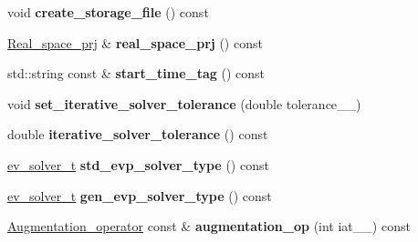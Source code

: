 \begin{DoxyCompactItemize}
\item 
\hypertarget{classsirius_1_1_simulation__context_a61ecdd5eae60b0b213d6c9ca95218bce}{}void {\bfseries create\+\_\+storage\+\_\+file} () const \label{classsirius_1_1_simulation__context_a61ecdd5eae60b0b213d6c9ca95218bce}

\item 
\hypertarget{classsirius_1_1_simulation__context_aeec6fe93912cbecd5c318cd3d00aa6b8}{}\hyperlink{classsirius_1_1_real__space__prj}{Real\+\_\+space\+\_\+prj} \& {\bfseries real\+\_\+space\+\_\+prj} () const \label{classsirius_1_1_simulation__context_aeec6fe93912cbecd5c318cd3d00aa6b8}

\item 
\hypertarget{classsirius_1_1_simulation__context_a76eefe6f28881152e2406340c73662a9}{}std\+::string const \& {\bfseries start\+\_\+time\+\_\+tag} () const \label{classsirius_1_1_simulation__context_a76eefe6f28881152e2406340c73662a9}

\item 
\hypertarget{classsirius_1_1_simulation__context_a28d1a35e1fea2921d498fb2a7510501b}{}void {\bfseries set\+\_\+iterative\+\_\+solver\+\_\+tolerance} (double tolerance\+\_\+\+\_\+)\label{classsirius_1_1_simulation__context_a28d1a35e1fea2921d498fb2a7510501b}

\item 
\hypertarget{classsirius_1_1_simulation__context_a978ba28b12e2e62c34e9adef0bb0bac3}{}double {\bfseries iterative\+\_\+solver\+\_\+tolerance} () const \label{classsirius_1_1_simulation__context_a978ba28b12e2e62c34e9adef0bb0bac3}

\item 
\hypertarget{classsirius_1_1_simulation__context_a136956341cfc80f77e3ec4a2b67757cd}{}\hyperlink{eigenproblem_8h_a203f2c57422a6e64834e6e9ab85982bf}{ev\+\_\+solver\+\_\+t} {\bfseries std\+\_\+evp\+\_\+solver\+\_\+type} () const \label{classsirius_1_1_simulation__context_a136956341cfc80f77e3ec4a2b67757cd}

\item 
\hypertarget{classsirius_1_1_simulation__context_a2403806b7725eaf863a2578628a9a2ac}{}\hyperlink{eigenproblem_8h_a203f2c57422a6e64834e6e9ab85982bf}{ev\+\_\+solver\+\_\+t} {\bfseries gen\+\_\+evp\+\_\+solver\+\_\+type} () const \label{classsirius_1_1_simulation__context_a2403806b7725eaf863a2578628a9a2ac}

\item 
\hypertarget{classsirius_1_1_simulation__context_a4844ab537db9c525ef14c8ef207b3590}{}\hyperlink{classsirius_1_1_augmentation__operator}{Augmentation\+\_\+operator} const \& {\bfseries augmentation\+\_\+op} (int iat\+\_\+\+\_\+) const \label{classsirius_1_1_simulation__context_a4844ab537db9c525ef14c8ef207b3590}


\end{DoxyCompactItemize}
